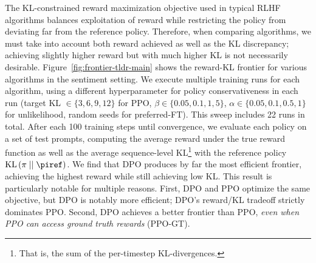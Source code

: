 The KL-constrained reward maximization objective used in typical RLHF algorithms balances exploitation of reward while restricting the policy from deviating far from the reference policy. Therefore, when comparing algorithms, we must take into account both reward achieved as well as the KL discrepancy; achieving slightly higher reward but with much higher KL is not necessarily desirable. Figure~\ref{fig:frontier-tldr-main} shows the reward-KL frontier for various algorithms in the sentiment setting. We execute multiple training runs for each algorithm, using a different hyperparameter for policy conservativeness in each run (target KL $\in\{3,6,9,12\}$ for PPO, $\beta \in \{0.05,0.1,1,5\}$, $\alpha\in\{0.05,0.1,0.5,1\}$ for unlikelihood, random seeds for preferred-FT). This sweep includes 22 runs in total. After each 100 training steps until convergence, we evaluate each policy on a set of test prompts, computing the average reward under the true reward function as well as the average sequence-level KL\footnote{That is, the sum of the per-timestep KL-divergences.} with the reference policy $\text{KL}\left(\pi\mid \mid \piref\right)$. We find that DPO produces by far the most efficient frontier, achieving the highest reward while still achieving low KL. This result is particularly notable for multiple reasons. First, DPO and PPO optimize the same objective, but DPO is notably more efficient; DPO's reward/KL tradeoff strictly dominates PPO. Second, DPO achieves a better frontier than PPO, \emph{even when PPO can access ground truth rewards} (PPO-GT).



